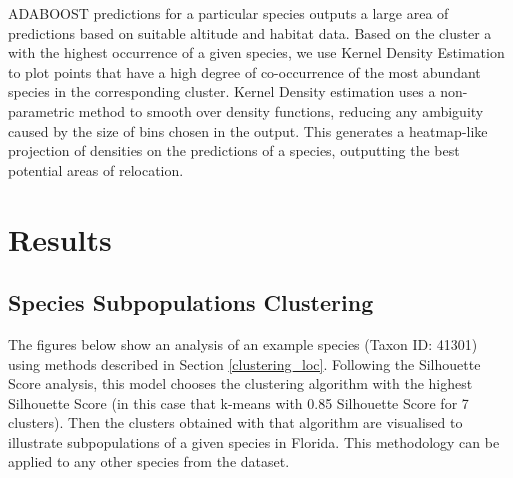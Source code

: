 \documentclass{article}
\begin{document}
ADABOOST predictions for a particular species outputs a large area of predictions based on suitable altitude and habitat data. Based on the cluster a with the highest occurrence of a given species, we use Kernel Density Estimation to plot points that have a high degree of co-occurrence of the most abundant species in the corresponding cluster. Kernel Density estimation uses a non-parametric method to smooth over density functions,  reducing any ambiguity caused by the size of bins chosen in the output. This generates a heatmap-like projection of densities on the predictions of a species, outputting the best potential areas of relocation\cite{kderef}.

\section{Results}

\subsection{Species Subpopulations Clustering}
The figures below show an analysis of an example species (Taxon ID: 41301) using methods described in Section \ref{clustering_loc}.  Following the Silhouette Score analysis, this model chooses the clustering algorithm  with the highest Silhouette Score (in this case that k-means with 0.85 Silhouette Score for 7 clusters). Then the clusters obtained with that algorithm are visualised to illustrate subpopulations of a given species in Florida. This methodology can be applied to any other species from the dataset.
\end{document}
